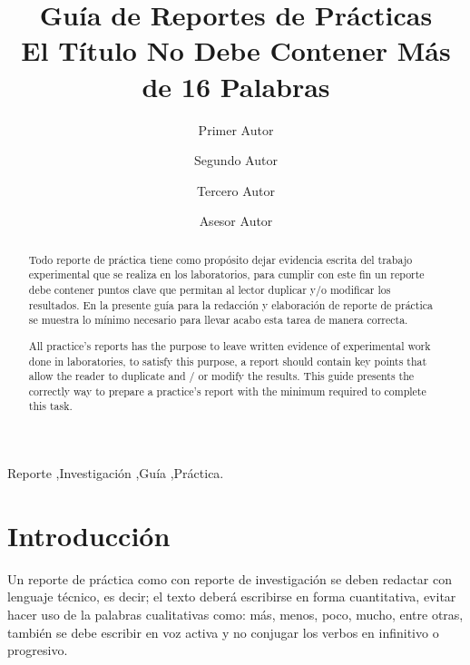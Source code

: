 \documentclass[times,5p, twocolumn]{elsarticle}
\begin{document}
\begin{frontmatter}
\title{Guía de Reportes de Prácticas\\ El Título No Debe Contener Más de 16 Palabras}

\author{Primer Autor}


\author{Segundo Autor}

\author{Tercero Autor}

\author{Asesor Autor}


\address{División de Ingeniería Mecatrónica\\Instituto Tecnológico Superior de Huichapan\\Dom. Conocido s/n., El Saucillo, Municipio de Huichapan, Hidalgo, México}

\begin{abstract}
Todo reporte de práctica tiene como propósito dejar evidencia escrita del trabajo experimental que se realiza en los laboratorios, para cumplir con este fin un reporte debe contener puntos clave que permitan al lector duplicar y/o modificar los  resultados. En la presente guía para la redacción y elaboración de reporte de práctica se muestra lo mínimo necesario para llevar acabo esta tarea de manera correcta.

All practice's reports has the purpose to leave written evidence of experimental work done in laboratories, to satisfy this purpose, a report should contain key points that allow the reader to duplicate and / or modify the results. This guide presents the correctly way to prepare a practice's report with the minimum required to complete this task. 

\end{abstract}
\begin{keyword}
Reporte \sep Investigación \sep Guía \sep Práctica.
\end{keyword}
\end{frontmatter}

\section{Introducción}
\noindent
Un reporte de práctica como con reporte de investigación se deben redactar con lenguaje técnico, es decir; el texto deberá escribirse en forma cuantitativa, evitar hacer uso de la palabras cualitativas como: más, menos, poco, mucho, entre otras, también se debe escribir en voz activa y no conjugar los verbos en infinitivo o progresivo.
\end{document}
